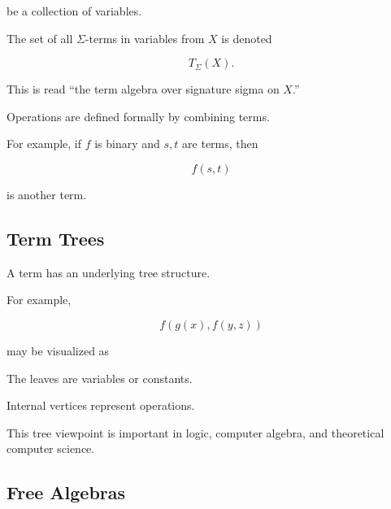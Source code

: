 be a collection of variables.

The set of all \(\Sigma\)-terms in variables from \(X\) is denoted

\[ T_\Sigma(X). \]

This is read ``the term algebra over signature sigma on \(X\).''

Operations are defined formally by combining terms.

For example, if \(f\) is binary and \(s,t\) are terms, then

\[ f(s,t) \]

is another term.

\subsection{Term Trees}
\label{subsec:term-trees}

A term has an underlying tree structure.

For example,

\[ f(g(x),f(y,z)) \]

may be visualized as

\begin{center}
\end{center}

The leaves are variables or constants.

Internal vertices represent operations.

This tree viewpoint is important in logic, computer algebra, and theoretical
computer science.

\subsection{Free Algebras}
\label{subsec:free-algebras}

